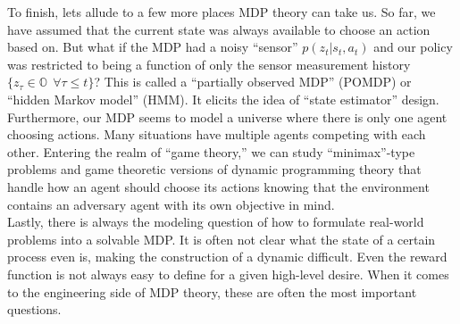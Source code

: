 To finish, lets allude to a few more places MDP theory can take us. So far, we have assumed that the current state was always available to choose an action based on. But what if the MDP had a noisy ``sensor'' $p(z_t|s_t,a_t)$ and our policy was restricted to being a function of only the sensor measurement history $\{z_\tau \in \mathbb{O}\ \ \forall \tau \leq t\}$? This is called a ``partially observed MDP'' (POMDP) or ``hidden Markov model'' (HMM). It elicits the idea of ``state estimator'' design.\\

Furthermore, our MDP seems to model a universe where there is only one agent choosing actions. Many situations have multiple agents competing with each other. Entering the realm of ``game theory,'' we can study ``minimax''-type problems and game theoretic versions of dynamic programming theory that handle how an agent should choose its actions knowing that the environment contains an adversary agent with its own objective in mind.\\

Lastly, there is always the modeling question of how to formulate real-world problems into a solvable MDP. It is often not clear what the state of a certain process even is, making the construction of a dynamic difficult. Even the reward function is not always easy to define for a given high-level desire. When it comes to the engineering side of MDP theory, these are often the most important questions.\\



